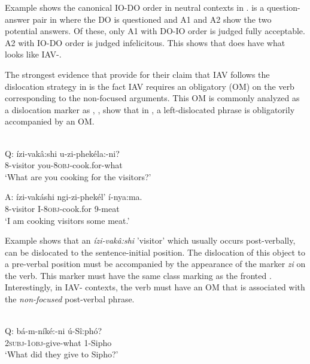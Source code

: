 \documentclass[output=paper,newtxmath,modfonts,nonflat,hidelinks]{langsci/langscibook}
\begin{document}
Example  shows the canonical IO-DO order in neutral contexts in .  is a question-answer pair in  where the DO is questioned and A1 and A2 show the two potential answers. Of these, only A1 with DO-IO order is judged fully acceptable. A2 with IO-DO order is judged infelicitous. This shows that  does have what looks like IAV-. 

The strongest evidence that \citet{chengdowning2012} provide for their claim that  IAV  follows the dislocation strategy in  is the fact  IAV requires an obligatory  (OM) on the verb corresponding to the non-focused arguments. This OM is commonly analyzed as a dislocation marker as \citet{vanderSpuy1993}, \citet{Buell2005,Buell2006}, \citet{Halpert2012} show that in , a left-dislocated phrase is obligatorily accompanied by an OM.

\ea\label{ex:selvanathan:2}
\\
Q: \gll ízi-vakâ:shi  u-zi-phekéla:-ni? \\
	8-visitor      you-\textsc{8obj}{}-cook.for-what \\
\glt \-\hspace{0.5cm}`What are you cooking for the visitors?' 

A: \gll  ízi-vakáshi    ngi-zi-phekél’    í-nya:ma.\\
	8-visitor      I-\textsc{8obj}{}-cook.for    9-meat\\
\glt \-\hspace{0.5cm}`I am cooking visitors some meat.'
\z



Example  shows that an  \textit{ízi-vakâ:shi} 'visitor' which usually occurs post-verbally, can be dislocated to the sentence-initial position. The dislocation of this object to a pre-verbal position must be accompanied by the appearance of the marker \textit{zi} on the verb. This marker must have the same class marking as the fronted . Interestingly, in IAV- contexts, the verb must have an OM that is associated with the \textit{non-focused} post-verbal phrase.  

\ea\label{ex:selvanathan:3}
 \citep[4]{chengdowning2012}\\
Q: \gll bá-m-níké:-ni      ú-Sî:phó?\\ 
	\textsc{2subj}{}-\textsc{1obj}{}-give-what    1-Sipho\\ 
	\glt \-\hspace{0.5cm}`What did they give to Sipho?’
\end{document}
